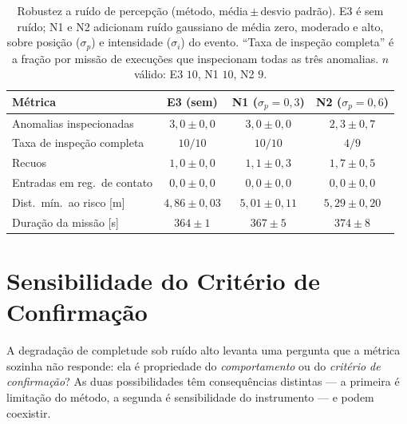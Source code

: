 \begin{table}[htb]
\centering
\caption{Robustez a ruído de percepção (método, média\,$\pm$\,desvio padrão). E3 é
sem ruído; N1 e N2 adicionam ruído gaussiano de média zero, moderado e alto, sobre
posição ($\sigma_p$) e intensidade ($\sigma_i$) do evento. ``Taxa de inspeção
completa'' é a fração por missão de execuções que inspecionam todas as três
anomalias. $n$ válido: E3 $10$, N1 $10$, N2 $9$.}
\label{tab:res-ruido}
\footnotesize
\begin{tabular}{lccc}
\hline
\textbf{Métrica} & \textbf{E3 (sem)} &
\textbf{N1 ($\sigma_p{=}0{,}3$)} & \textbf{N2 ($\sigma_p{=}0{,}6$)}\\
\hline
Anomalias inspecionadas    & $3{,}0\pm0{,}0$  & $3{,}0\pm0{,}0$  & $2{,}3\pm0{,}7$\\
Taxa de inspeção completa  & $10/10$          & $10/10$          & $4/9$\\
Recuos                     & $1{,}0\pm0{,}0$  & $1{,}1\pm0{,}3$  & $1{,}7\pm0{,}5$\\
Entradas em reg.\ de contato & $0{,}0\pm0{,}0$ & $0{,}0\pm0{,}0$ & $0{,}0\pm0{,}0$\\
Dist.\ mín.\ ao risco [m]  & $4{,}86\pm0{,}03$& $5{,}01\pm0{,}11$& $5{,}29\pm0{,}20$\\
Duração da missão [s]      & $364\pm1$        & $367\pm5$        & $374\pm8$\\
\hline
\end{tabular}
\end{table}

\section{Sensibilidade do Critério de Confirmação}
\label{sec:res-confirmacao}

A degradação de completude sob ruído alto levanta uma pergunta que a métrica sozinha
não responde: ela é propriedade do \emph{comportamento} ou do \emph{critério de
confirmação}? As duas possibilidades têm consequências distintas --- a primeira é
limitação do método, a segunda é sensibilidade do instrumento --- e podem coexistir.

